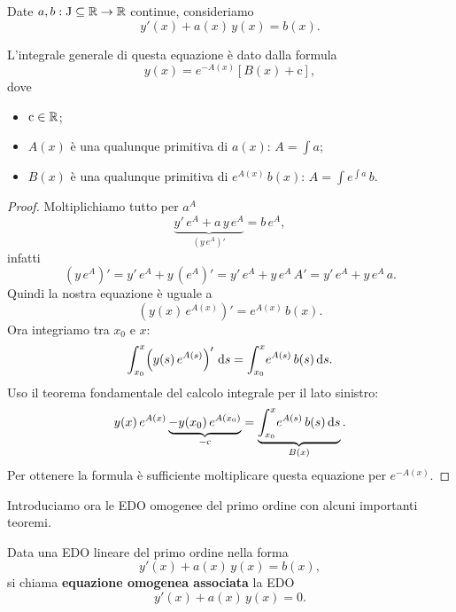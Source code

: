 \documentclass[../../analisi2]{subfiles}
\begin{document}
        \begin{teorema}
            Date \(a, b : \mathrm{J} \subseteq \mathbb{R} \to \mathbb{R}\) continue, consideriamo
            \[
                y'(x) + a(x) \, y(x) = b(x).
            \]

            L'integrale generale di questa equazione è dato dalla formula
            \[
                y(x) = e^{-A(x)} \left[B(x) + \mathrm{c}\right],
            \]
            dove
            \begin{itemize}
                \item \(\mathrm{c} \in \mathbb{R}\);
                \item \(A(x)\) è una qualunque primitiva di \(a(x)\): \(A = \int \! a\);
                \item \(B(x)\) è una qualunque primitiva di \(e^{A(x)} \, b(x)\): \(A = \int \! e^{\int \! a} \, b\).
            \end{itemize}
        \end{teorema}
        \begin{proof}
            Moltiplichiamo tutto per \(a^A\)
            \[
                \underbrace{y' \, e^A + a \, y \, e^A}_{\left(y \, e^A\right)'} = b \, e^A,
            \]
            infatti
            \[
                \left(y \, e^A\right)' = y' \, e^A + y \, \left(e^A\right)' = y' \, e^A + y \, e^A \, A' = y' \, e^A + y \, e^A \, a.
            \]
            Quindi la nostra equazione è uguale a
            \[
                \left(y(x) \, e^{A(x)}\right)' = e^{A(x)} \, b(x).
            \]
            Ora integriamo tra \(x_0\) e \(x\):
            \[
                \int_{x_0}^{x} \! \left(y(s) \, e^{A(s)}\right)' \, \mathrm{d}s = \int_{x_0}^{x} \! e^{A(s)} \, b(s) \, \mathrm{d}s.
            \]
            Uso il teorema fondamentale del calcolo integrale per il lato sinistro:
            \[
                y(x) \, e^{A(x)} \underbrace{- y(x_0) \, e^{A(x_0)}}_{- \mathrm{c}} = \underbrace{\int_{x_0}^{x} \! e^{A(s)} \, b(s) \, \mathrm{d}s}_{B(x)}.
            \]
            Per ottenere la formula è sufficiente moltiplicare questa equazione per \(e^{-A(x)}\).
        \end{proof}

        Introduciamo ora le EDO omogenee del primo ordine con alcuni importanti teoremi.

        \begin{definizione}
            Data una EDO lineare del primo ordine nella forma
            \[
                y'(x) + a(x) \, y(x) = b(x),
            \]
            si chiama \textbf{equazione omogenea associata} la EDO
            \[
                y'(x) + a(x) \, y(x) = 0.
            \]
        \end{definizione}
\end{document}
